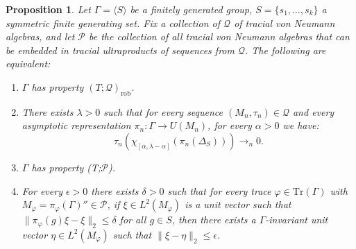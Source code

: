 \documentclass[11pt]{amsart}
\newcommand{\Tr}[1]{\mathrm{Tr}\left(#1\right)}
\newcommand{\cQ}{{\mathcal{Q}}}
\newcommand{\cP}{{\mathcal{P}}}
\newtheorem{proposition}[theorem]{Proposition}
\theoremstyle{definition}
\theoremstyle{remark}
\theoremstyle{definition}
\begin{document}
\begin{proposition}\label{prop:eq defs of robust}
    Let $\Gamma = \langle S \rangle$ be a finitely generated group, $S=\{s_1, \dots, s_k\}$ a symmetric finite generating set. 
    Fix a collection of \(\mathcal{Q}\) of tracial von Neumann algebras, and let $\mathcal P$ be the collection of all tracial von Neumann algebras that can be embedded in tracial ultraproducts of sequences from $\cQ$.
    The following are equivalent:
    \begin{enumerate}
        \item  $\Gamma$ has property $(T;\cQ)_\mathrm{rob}$.
        \item There exists $\lambda > 0$ such that for every sequence  $(M_n,\tau_n) \in \cQ$ and every  asymptotic representation $\pi_n: \Gamma \to U(M_n)$, for every $\alpha> 0$ we have:
            $$\tau_n(\chi_{[\alpha,\lambda-\alpha]}(\pi_n(\Delta_S))) \to_n 0.$$
        \item  $\Gamma$ has property (T;$\cP$). %
        \item For every $\epsilon> 0 $ there exists $\delta > 0$ such that for every trace $\varphi \in \Tr{\Gamma}$ with $M_\varphi = \pi_\varphi(\Gamma)'' \in \cP$, if $\xi \in L^2(M_\varphi)$ is a unit vector such that $\| \pi_\varphi(g)\xi - \xi \|_2 \leq \delta$ for all $g \in S$, then there exists a $\Gamma$-invariant unit vector $\eta \in L^2(M_\varphi)$ such that $\| \xi - \eta \|_2 \leq \epsilon$. 
    \end{enumerate}
\end{proposition}
\end{document}
